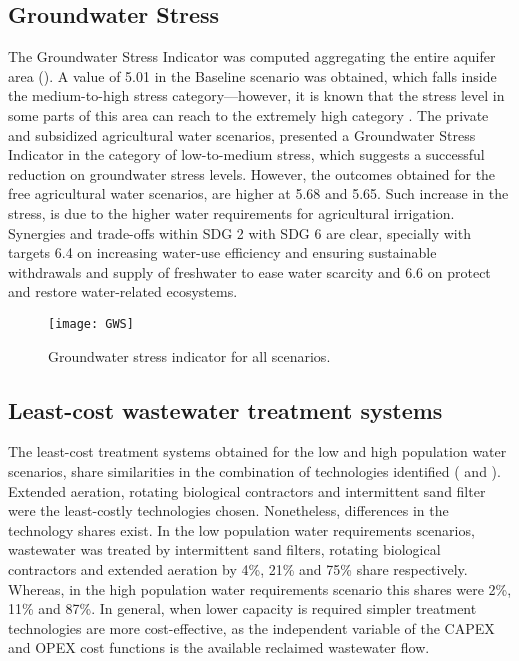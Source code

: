 \subsection{Groundwater Stress}
The Groundwater Stress Indicator was computed aggregating the entire aquifer area (). A value of 5.01 in the Baseline scenario was obtained, which falls inside the medium-to-high stress category---however, it is known that the stress level in some parts of this area can reach to the extremely high category \cite{herbertGlobalAssessmentCurrent2019}. The private and subsidized agricultural water scenarios, presented a Groundwater Stress Indicator in the category of low-to-medium stress, which suggests a successful reduction on groundwater stress levels. However, the outcomes obtained for the free agricultural water scenarios, are higher at 5.68 and 5.65. Such increase in the stress, is due to the higher water requirements for agricultural irrigation. Synergies and trade-offs within SDG 2 with SDG 6 are clear, specially with targets 6.4 on increasing water-use efficiency and ensuring sustainable withdrawals and supply of freshwater to ease water scarcity and 6.6 on protect and restore water-related ecosystems.

\begin{figure}[!t]
	\centering
	\texttt{[image: GWS]}
	\caption{Groundwater stress indicator for all scenarios.}
	\label{fig:gws}
\end{figure}
\newpage
\subsection{Least-cost wastewater treatment systems}
The least-cost treatment systems obtained for the low and high population water scenarios, share similarities in the combination of technologies identified ( and ). Extended aeration, rotating biological contractors and intermittent sand filter were the least-costly technologies chosen. Nonetheless, differences in the technology shares exist. In the low population water requirements scenarios, wastewater was treated by intermittent sand filters, rotating biological contractors and extended aeration by 4\%, 21\% and 75\% share respectively. Whereas, in the high population water requirements scenario this shares were 2\%, 11\% and 87\%. In general, when lower capacity is required simpler treatment technologies are more cost-effective, as the independent variable of the CAPEX and OPEX cost functions is the available reclaimed wastewater flow.

